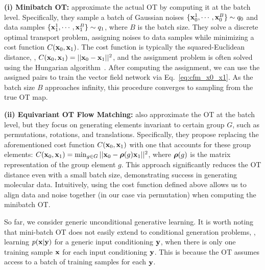 \textbf{(i) Minibatch OT:} \citet{tong2023improving,pooladian2023multisample} approximate the actual OT by computing it at the batch level.
Specifically, they sample a batch of Gaussian noises $\{{\mathbf{x}}^1_0, \cdots, {\mathbf{x}}^B_0\} \sim q_0$ and data samples $\{{\mathbf{x}}^1_1, \cdots, {\mathbf{x}}^B_1\} \sim q_1$, where $B$ is the batch size.
%
They solve a discrete optimal transport problem, assigning noises to data samples while minimizing a cost function $C({\mathbf{x}}_0, {\mathbf{x}}_1)$.
%
The cost function is typically the squared-Euclidean distance, \ie, $C({\mathbf{x}}_0, {\mathbf{x}}_1) = ||{\mathbf{x}}_0 - {\mathbf{x}}_1||^2$, and the assignment problem is often solved using the Hungarian algorithm~\cite{kuhn1955hungarian}.
%
%
After computing the assignment, we can use the assigned pairs to train the vector field network via Eq.~\ref{eq:cfm_x0_x1}.
%
As the batch size $B$ approaches infinity, this procedure converges to sampling from the true OT map.
    
\textbf{(ii) Equivariant OT Flow Matching:} \citet{song2024equivariant,klein2024equivariant} also approximate the OT at the batch level, but they focus on generating elements invariant to certain group $G$, such as permutations, rotations, and translations.
%
Specifically, they propose replacing the aforementioned cost function $C({\mathbf{x}}_0, {\mathbf{x}}_1)$ with one that accounts for these group elements: $C({\mathbf{x}}_0, {\mathbf{x}}_1) = \min_{g \in G}||{\mathbf{x}}_0 - {\bm{\rho}}(g) {\mathbf{x}}_1||^2$, where ${\bm{\rho}}(g)$ is the matrix representation of the group element $g$.
%
%
This approach significantly reduces the OT distance even with a small batch size, demonstrating success in generating molecular data.
%
Intuitively, using the cost function defined above allows us to align data and noise together (in our case via permutation) when computing the minibatch OT.

So far, we consider generic unconditional generative learning. 
It is worth noting that mini-batch OT does not easily extend to conditional generation problems, \ie, learning $p({\mathbf{x}}|{\mathbf{y}})$ for a generic input conditioning ${\mathbf{y}}$, when there is only one training sample ${\mathbf{x}}$ for each input conditioning ${\mathbf{y}}$.
%
This is because the OT assumes access to a batch of training samples for each 
${\mathbf{y}}$.


